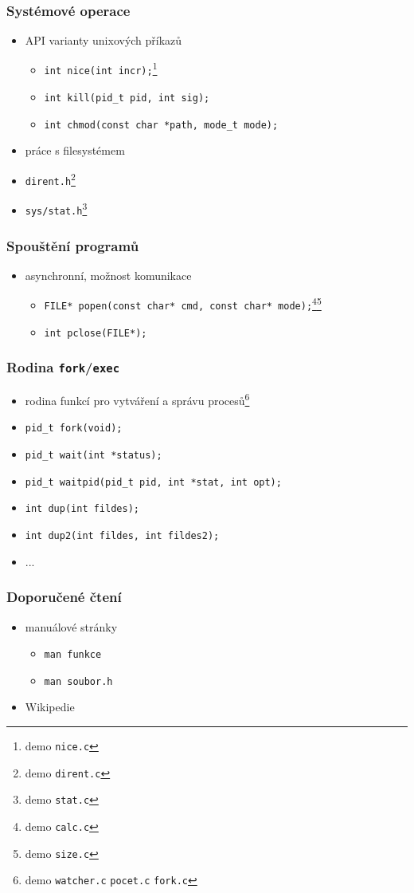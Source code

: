 \begin{frame}
	\frametitle{Systémové operace}
	\begin{itemize}
		\item{API varianty unixových příkazů}
		\begin{itemize}
			\item{\texttt{int nice(int incr);}\footnote{demo \texttt{nice.c}}}
			\item{\texttt{int kill(pid\_t pid, int sig);}}
			\item{\texttt{int chmod(const char *path, mode\_t mode);}}
		\end{itemize}
		\item{práce s filesystémem}
		\item{\texttt{dirent.h}\footnote{demo \texttt{dirent.c}}}
		\item{\texttt{sys/stat.h}\footnote{demo \texttt{stat.c}}}
	\end{itemize}
\end{frame}

\begin{frame}
	\frametitle{Spouštění programů}
	\begin{itemize}
		\item{asynchronní, možnost komunikace}
		\begin{itemize}
			\item{\texttt{FILE* popen(const char* cmd, const char* mode);}\footnote{demo \texttt{calc.c}}\footnote{demo \texttt{size.c}}}
			\item{\texttt{int pclose(FILE*);}}
		\end{itemize}
	\end{itemize}
\end{frame}

\begin{frame}
	\frametitle{Rodina \texttt{fork}/\texttt{exec}}
	\begin{itemize}
		\item{rodina funkcí pro vytváření a správu procesů\footnote{demo \texttt{watcher.c} \texttt{pocet.c} \texttt{fork.c}}}
		\item{\texttt{pid\_t fork(void);}}
		\item{\texttt{pid\_t wait(int *status);}}
		\item{\texttt{pid\_t waitpid(pid\_t pid, int *stat, int opt);}}
		\item{\texttt{int dup(int fildes);}}
		\item{\texttt{int dup2(int fildes, int fildes2);}}
		\item{...}
	\end{itemize}
\end{frame}

\begin{frame}
	\frametitle{Doporučené čtení}
	\begin{itemize}
		\item{manuálové stránky}
		\begin{itemize}
			\item{\texttt{man funkce}}
			\item{\texttt{man soubor.h}}
		\end{itemize}
		\item{Wikipedie}
	\end{itemize}
\end{frame}



